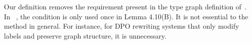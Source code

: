 \begin{remark}
    \label{remark:greater_than_1}
    Our definition removes the requirement  present in the type graph definition of~\cite{endrullis2024generalized}. In ~\cite{endrullis2024generalized}, the condition is only used 
    once in Lemma 4.10(B).
    It is not essential to the method in general. For instance, for DPO rewriting systems that only modify labels and preserve graph structure, it is unnecessary.
\end{remark} 